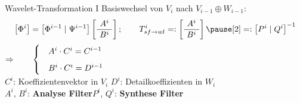 	\begin{frame}{Wavelet-Transformation I}
		\alert{Basiswechsel} von $V_{i}$ nach $V_{i-1}\oplus W_{i-1}$: \vspace{2mm}\[ \left[ \Phi^i\right] =\left[ \Phi^{i-1}\mid \Psi^{i-1}\right]\left[ \frac{\ A^i\ }{\ B^i\ }\right];\qquad T^i_{sf\rightarrow wl}=:\left[ \frac{\ A^i\ }{\ B^i\ }\right]\pause[2]=:\left[ P^i\mid Q^i\right]^{-1}\vspace{3mm}\]\pause[3]
		$\Rightarrow\qquad \begin{cases}
			&A^i\cdot C^i=C^{i-1}\vspace{2mm}\\
			&B^i\cdot C^i=D^{i-1}
		\end{cases}$\vspace{10mm}\\
		$C^i$: Koeffizientenvektor in $V_i$\hspace{8.8mm} $D^i$: Detailkoeffizienten in $W_i$\vspace{2mm}\\ \pause[1]
		$A^i$, $B^i$: {\bf Analyse Filter}\hspace{22mm}\pause[2] $P^i$, $Q^i$: {\bf Synthese Filter}
	\end{frame}

